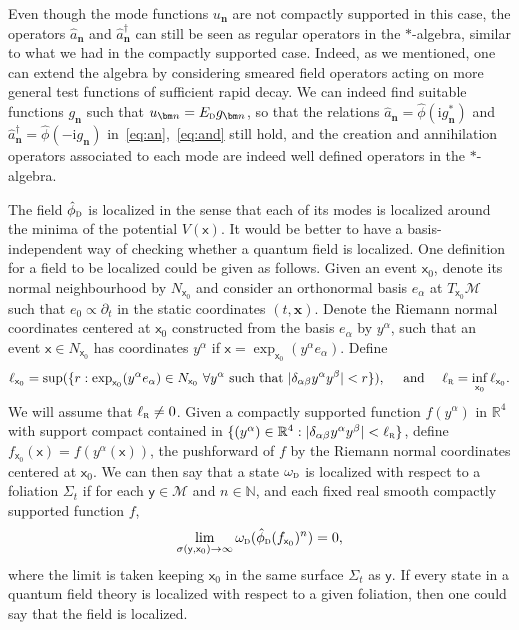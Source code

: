 \documentclass[letterpaper,12pt,titlepage,oneside,final]{book}
\newcommand{\M}{\mathcal{M}}
\newcommand{\mf}{\mathsf}%
\newcommand{\ii}{\mathrm{i}}
\newcommand{\tc}[1]{\textsc{#1}}
\begin{document}
Even though the mode functions $u_{\bm n}$ are not compactly supported in this case, the operators $\hat{a}_{\bm n}$ and $\hat{a}_{\bm n}^\dagger$ can still be seen as regular operators in the $\ast$-algebra, similar to what we had in the compactly supported case. Indeed, as we mentioned, one can extend the algebra by considering smeared field operators acting on more general test functions of sufficient rapid decay. We can indeed find suitable functions $g_{\bm n}$ such that $u_{\bm n} = E_{\tc{d}}g_{\bm n}$, so that the relations $\hat{a}_{\bm n} = \hat{\phi}(\ii g_{\bm n}^*)$ and $\hat{a}_{\bm n}^\dagger = \hat{\phi}(- \ii g_{\bm n})$ in~\eqref{eq:an},~\eqref{eq:and} still hold, and the creation and annihilation operators associated to each mode are indeed well defined operators in the $\ast$-algebra.


The field $\hat{\phi}_\tc{d}$ is localized in the sense that each of its modes is localized around the minima of the potential $V(\mf x)$. It would be better to have a basis-independent way of checking whether a quantum field is localized. One definition for a field to be localized could be given as follows. Given an event $\mf x_0$, denote its normal neighbourhood by $N_{\mf x_0}$ and consider an orthonormal basis $e_{\alpha}$ at $T_{\mf x_0}\M$ such that $e_0 \propto \partial_t$ in the static coordinates $(t,\bm x)$. Denote the Riemann normal coordinates centered at $\mf x_0$ constructed from the basis $e_\alpha$ by $y^\alpha$, such that an event $\mf x\in N_{\mf x_0}$ has coordinates $y^\alpha$ if $\mf x = \exp_{\mf x_0}(y^\alpha e_\alpha)$. Define
\begin{equation}
    \ell_{\mf x_0} = \sup(\{r:\exp_{\mf x_0}(y^\alpha e_\alpha)\in N_{\mf x_0}\,\,\forall y^\alpha \text{ such that } |\delta_{\alpha\beta}y^\alpha y^\beta| < r\}),\quad \text{ and } \quad \ell_{\tc{r}} = \inf_{\mf x_0} \ell_{\mf x_0}.
\end{equation} 
We will assume that $\ell_\tc{r}\neq 0$. Given a compactly supported function $f(y^\alpha)$ in $\mathbb{R}^4$ with support compact contained in $\{(y^\alpha)\in \mathbb{R}^4: |\delta_{\alpha\beta} y^\alpha y^\beta | < \ell_\tc{r}\}$, define ${f}_{\mf x_0}(\mf x) = f(y^\alpha(\mf x))$, the pushforward of $f$ by the Riemann normal coordinates centered at $\mf x_0$. We can then say that a state $\omega_\tc{d}$ is localized with respect to a foliation $\Sigma_t$ if for each $\mf y \in \M$ and $n\in \mathbb{N}$, and each fixed real smooth compactly supported function $f$, 
\begin{equation}
    \lim_{\sigma(\mf y, \mf x_0)\to \infty}\omega_\tc{d}(\hat{\phi}_\tc{d}({f}_{\mf x_0})^n) = 0,\label{eq:locCond}
\end{equation}
where the limit is taken keeping $\mf x_0$ in the same surface $\Sigma_t$ as $\mf y$. If every state in a quantum field theory is localized with respect to a given foliation, then one could say that the field is localized.
\end{document}
